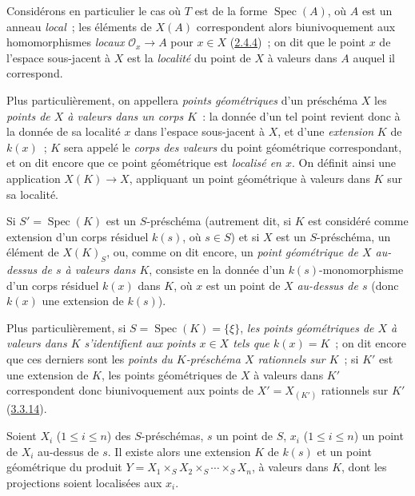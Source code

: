 \begin{env}[3.4.5]
\label{I.3.4.5-fr}
Considérons en particulier le cas où $T$ est de la forme $\operatorname{Spec}(A)$,
où $A$ est un anneau \emph{local}~; les éléments de $X(A)$ correspondent alors
biunivoquement aux homomorphismes \emph{locaux} $\mathcal{O}_x\to A$ pour
$x\in X$ (\hyperref[I.2.4.4-fr]{2.4.4})~; on dit que le point $x$ de l'espace
sous-jacent à $X$ est la \emph{localité} du point de $X$ à valeurs dans $A$
auquel il correspond.

Plus particulièrement, on appellera \emph{points géométriques} d'un préschéma
$X$ les \emph{points de $X$ à valeurs dans un corps $K$}~: la donnée d'un tel
point revient donc à la donnée de sa
localité $x$ dans l'espace sous-jacent à $X$, et d'une \emph{extension} $K$ de
$k(x)$~; $K$ sera appelé le \emph{corps des valeurs} du point géométrique
correspondant, et on dit encore que ce point géométrique est \emph{localisé en
$x$}. On définit ainsi une application $X(K)\to X$, appliquant un point
géométrique à valeurs dans $K$ sur sa localité.

Si $S'=\operatorname{Spec}(K)$ est un $S$-préschéma (autrement dit, si $K$ est
considéré comme extension d'un corps résiduel $k(s)$, où $s\in S$) et si $X$
est un $S$-préschéma, un élément de $X(K)_S$, ou, comme on dit encore, un
\emph{point géométrique de $X$ au-dessus de $s$ à valeurs dans $K$}, consiste
en la donnée d'un $k(s)$-monomorphisme d'un corps résiduel $k(x)$ dans $K$, où
$x$ est un point de $X$ \emph{au-dessus de $s$} (donc $k(x)$ une extension de
$k(s)$).

Plus particulièrement, si $S=\operatorname{Spec}(K)=\{\xi\}$, \emph{les points
géométriques de $X$ à valeurs dans $K$ s'identifient aux points $x\in X$ tels
que $k(x)=K$}~; on dit encore que ces derniers sont les \emph{points du
$K$-préschéma $X$ rationnels sur $K$}~; si $K'$ est une extension de $K$, les
points géométriques de $X$ à valeurs dans $K'$ correspondent donc
biunivoquement aux points de $X'=X_{(K')}$ rationnels sur $K'$
(\hyperref[I.3.3.14-fr]{3.3.14}).
\end{env}

\begin{lemma}[3.4.6]
\label{I.3.4.6-fr}
Soient $X_i$ ($1\leq i\leq n$) des $S$-préschémas, $s$ un point de $S$, $x_i$
($1\leq i\leq n$) un point de $X_i$ au-dessus de $s$. Il existe alors une
extension $K$ de $k(s)$ et un point géométrique du produit
$Y=X_1\times_S X_2\times_S\cdots\times_S X_n$, à valeurs dans $K$, dont les
projections soient localisées aux $x_i$.
\end{lemma}

